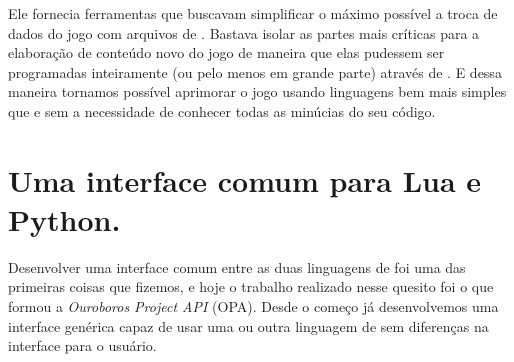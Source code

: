 
    Ele fornecia ferramentas que buscavam simplificar o máximo possível a
    troca de dados do jogo com arquivos de \script{}. Bastava isolar as
    partes mais críticas para a elaboração de conteúdo novo do jogo de maneira
    que elas pudessem ser programadas inteiramente (ou pelo menos em grande
    parte) através de . E dessa maneira tornamos possível aprimorar o
    jogo usando linguagens bem mais simples que \CXX{} e sem a necessidade de
    conhecer todas as minúcias do seu código.


  
  
  \section{Uma interface comum para Lua e Python.}
  \label{sec:atividades:opa}
  Desenvolver uma interface comum entre as duas linguagens de \script{} foi uma das 
  primeiras coisas que fizemos, e hoje o trabalho realizado nesse quesito foi o que
  formou a \emph{Ouroboros Project API} (OPA). Desde o começo já desenvolvemos uma
  interface genérica capaz de usar uma ou outra linguagem de \script{} sem
  diferenças na interface para o usuário.
  
